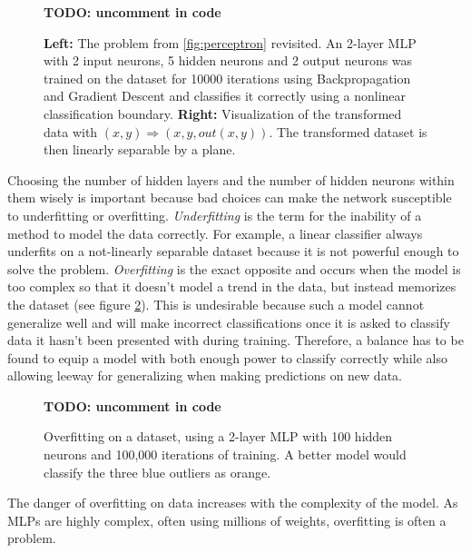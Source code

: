 \begin {figure}[!ht]
		\begin{center}
			\textbf{TODO: uncomment in code}
		\end{center}
		\caption[]{\textbf{Left:} The problem from \ref{fig:perceptron} revisited. An 2-layer MLP with 2 input neurons, 5 hidden neurons and 2 output neurons was trained on the dataset for 10000 iterations using Backpropagation and Gradient Descent and classifies it correctly using a nonlinear classification boundary. \textbf{Right:} Visualization of the transformed data with $(x, y) \Rightarrow (x, y, out(x, y))$. The transformed dataset is then linearly separable by a plane.}
		\label{fig:mlp_trick}
	\end {figure}

\noindent Choosing the number of hidden layers and the number of hidden neurons within them wisely is important because bad choices can make the network susceptible to underfitting or overfitting.
\textit{Underfitting} is the term for the inability of a method to model the data correctly. For example, a linear classifier always underfits on a not-linearly separable dataset because it is not powerful enough to solve the problem. \textit{Overfitting} is the exact opposite and occurs when the model is too complex so that it doesn't model a trend in the data, but instead memorizes the dataset (see figure \ref{fig:overfit}). This is undesirable because such a model cannot generalize well and will make incorrect classifications once it is asked to classify data it hasn't been presented with during training. Therefore, a balance has to be found to equip a model with both enough power to classify correctly while also allowing leeway for generalizing when making predictions on new data.

	\begin {figure}[!ht]
		\begin{center}
			\textbf{TODO: uncomment in code}
		\end{center}
		\caption[]{Overfitting on a dataset, using a 2-layer MLP with 100 hidden neurons and 100,000 iterations of training. A better model would classify the three blue outliers as orange.}
		\label{fig:overfit}
	\end {figure}

\noindent The danger of overfitting on data increases with the complexity of the model. As MLPs are highly complex, often using millions of weights, overfitting is often a problem. 




